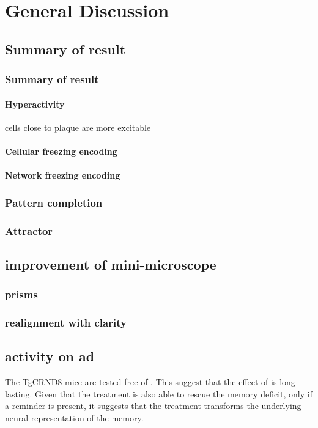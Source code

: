 \chapter{General Discussion}
\section{Summary of result}
\subsection{Summary of result}
\subsubsection{Hyperactivity}
    \citep{busche12} cells close to plaque are more excitable
\subsubsection{Cellular freezing encoding}
\subsubsection{Network freezing encoding}
\subsection{Pattern completion}
\subsection{Attractor}
\section{improvement of mini-microscope}
\subsection{prisms}
\subsection{realignment with clarity}
\section{activity on \gls{ad}}

The TgCRND8 mice are tested free of \tglu. This suggest that the effect of \tglu is long lasting. Given that the \tglu treatment is also able to rescue the memory deficit, only if a reminder is present, it suggests that the \tglu treatment transforms the underlying neural representation of the memory.  

